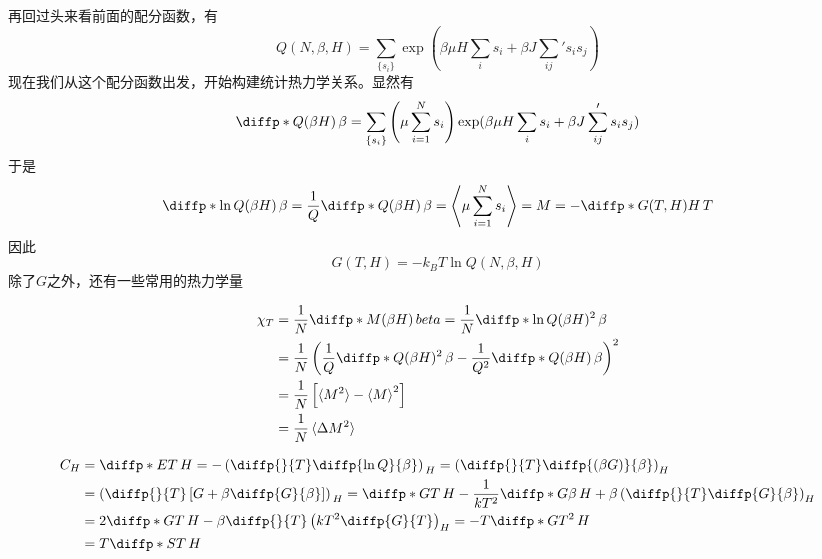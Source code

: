 \documentclass[AutoFakeBold]{tstextbook}
\begin{document}
再回过头来看前面的配分函数，有\begin{equation}
    Q(N,\beta, H) =\sum_{\{s_i\}} \exp( \beta \mu H \sum_i s_i +\beta J \sum_{ij}' s_is_j)
\end{equation}
现在我们从这个配分函数出发，开始构建统计热力学关系。显然有\begin{equation}
    \diffp*{Q}{{(\beta H)}}{\, \beta} =\sum_{\{s_i\}} \left(\mu \sum_{i=1}^{N} s_i\right) \exp( \beta \mu H \sum_i s_i +\beta J \sum_{ij}' s_is_j)
\end{equation}
于是\begin{equation}
    \diffp*{\ln Q}{{(\beta H)}}{\, \beta}= \frac{1}{Q} \diffp*{Q}{{(\beta H)}}{\, \beta} = \Braket{\mu \sum_{i=1}^{N} s_i }=M =-\diffp*{G(T,H)}{H}{\, T}
\end{equation}
因此\begin{equation}
    G(T,H) = -k_B T \ln Q(N,\beta ,H)
\end{equation}
除了$G$之外，还有一些常用的热力学量
\begin{definition}
    \begin{equation}
        \begin{aligned}
            \chi_T &= \frac{1}{N} \diffp*{M}{{(\beta H)}}{\, beta}=\frac{1}{N} \diffp*{\ln Q}{{(\beta H)^2}}{\, \beta}\\
            &=\frac{1}{N} \left( \frac1Q \diffp*{Q}{{(\beta H)^2}}{\,\beta} -\frac{1}{Q^2} \diffp*{Q}{{(\beta H)}}{\,\beta}\right)^2\\
            &=\frac1N \left[\braket{M^2}-\braket{M}^2\right]\\
            &=\frac1N \braket{\Delta M^2}
        \end{aligned}
    \end{equation}
\end{definition}
\begin{definition}[等场热容$C_H$]
    \begin{equation}
        \begin{aligned}
            C_H &= \diffp*{E}{T}{\, H} =- \left(\diffp{}{T} \diffp{\ln Q}{\beta}\right)_{\, H}= \left(\diffp{}{T} \diffp{{(\beta G)}}{\beta}\right)_{ H} \\
            &=\left(\diffp{}{T} \left[ G +\beta \diffp{G}{\beta}\right]\right)_{\, H}= \diffp*{G}{T}{\, H} -\frac{1}{kT^2}\diffp*{G}{\beta}{\, H} +\beta \left(\diffp{}{T} \diffp{G}{\beta}\right)_{H}\\
            & = 2 \diffp*{G}{T}{\,H} -\beta \diffp{}{T} \left(kT^2 \diffp{G}{T}\right)_{H}= -T \diffp*{G}{{T^2}}{\,H}\\
            &= T\diffp*{S}{T}{\, H}
        \end{aligned}
    \end{equation}
\end{definition}
\end{document}
